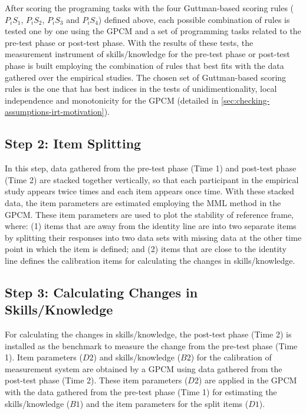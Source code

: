 After scoring the programing tasks with the four Guttman-based scoring rules ($P_{i}S_{1}$, $P_{i}S_{2}$, $P_{i}S_{3}$ and $P_{i}S_{4}$) defined above, each possible combination of rules is tested one by one using the GPCM and a set of programming tasks related to the pre-test phase or post-test phase. With the results of these tests, the measurement instrument of skills/knowledge for the pre-test phase or post-test phase is built employing the combination of rules that best fits with the data gathered over the empirical studies. The chosen set of Guttman-based scoring rules is the one that has best indices in the tests of unidimentionality, local independence and monotonicity for the GPCM (detailed in \autoref{sec:checking-assumptions-irt-motivation}).

\subsection{Step 2: Item Splitting}

In this step, data gathered from the pre-test phase (Time 1) and post-test phase (Time 2) are stacked together vertically, so that each participant in the empirical study appears twice times and each item appears once time. With these stacked data, the item parameters are estimated employing the MML method in the GPCM. These item parameters are used to plot the stability of reference frame, where: (1) items that are away from the identity line are  into two separate items by splitting their responses into two data sets with missing data at the other time point in which the item is defined; and (2) items that are close to the identity line defines the calibration items for calculating the changes in skills/knowledge.

\subsection{Step 3: Calculating Changes in Skills/Knowledge}

For calculating the changes in skills/knowledge, the post-test phase (Time 2) is installed as the benchmark to measure the change from the pre-test phase (Time 1). Item parameters ($D2$) and skills/knowledge ($B2$) for the calibration of measurement system are obtained by a GPCM using data gathered from the post-test phase (Time 2). These item parameters ($D2$) are applied in the GPCM with the data gathered from the pre-test phase (Time 1) for estimating the skills/knowledge ($B1$) and the item parameters for the split items ($D1$).

